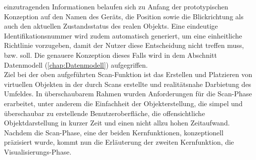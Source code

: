 einzutragenden Informationen belaufen sich zu Anfang der prototypischen Konzeption auf den Namen des Geräts, die Position sowie die 
Blickrichtung als auch den aktuellen Zustandsstatus des realen Objekts. Eine eindeutige Identifikationsnummer wird zudem automatisch generiert, 
um eine einheitliche Richtlinie vorzugeben, damit der Nutzer diese Entscheidung nicht treffen muss, bzw. soll. Die genauere Konzeption 
dieses Falls wird in dem Abschnitt Datenmodell (\ref{chap:Datenmodell}) aufgegriffen. 
\\ 
Ziel bei der oben aufgeführten Scan-Funktion ist das Erstellen und Platzieren von virtuellen Objekten in der durch Scans erstellte und 
realitätsnahe Darbietung des Umfeldes. In überschaubarem Rahmen wurden Anforderungen für die Scan-Phase erarbeitet, unter anderem die 
Einfachheit der Objekterstellung, die simpel und überschaubar zu erstellende Benutzeroberfläche, die offensichtliche Objektdarstellung 
in kurzer Zeit und einen nicht allzu hohen Zeitaufwand.
\\ 
\linebreak
Nachdem die Scan-Phase, eine der beiden Kernfunktionen, konzeptionell präzisiert wurde, kommt nun die Erläuterung der zweiten Kernfunktion, 
die Visualisierungs-Phase. 

